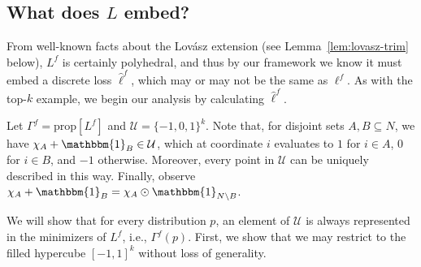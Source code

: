 \documentclass[12pt]{article}
\newcommand{\prop}[1]{\mathrm{prop}[#1]}
\newcommand{\U}{\mathcal{U}}
\newcommand{\ones}{\mathbbm{1}}
\begin{document}
\subsection{What does $L$ embed?}

From well-known facts about the Lov\'asz extension (see Lemma~\ref{lem:lovasz-trim} below), $L^f$ is certainly polyhedral, and thus by our framework we know it must embed a discrete loss $\hat\ell^f$, which may or may not be the same as $\ell^f$.
As with the top-$k$ example, we begin our analysis by calculating $\hat\ell^f$.

Let $\Gamma^f = \prop{L^f}$ and $\U = \{-1,0,1\}^k$.
Note that, for disjoint sets $A,B \subseteq N$, we have $\chi_A + \ones_B \in \U$, which at coordinate $i$ evaluates to $1$ for $i\in A$, $0$ for $i\in B$, and $-1$ otherwise.
Moreover, every point in $\U$ can be uniquely described in this way.
Finally, observe $\chi_A + \ones_B = \chi_A \odot \ones_{N\setminus B}$.

We will show that for every distribution $p$, an element of $\U$ is always represented in the minimizers of $L^f$, i.e., $\Gamma^f(p)$.
First, we show that we may restrict to the filled hypercube $[-1,1]^k$ without loss of generality.
\end{document}
